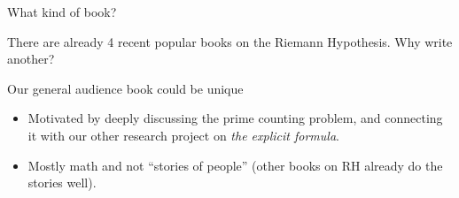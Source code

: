 \documentclass{beamer}
\begin{document}
\begin{frame}{What kind of book?}

There are already 4 recent popular books on the Riemann Hypothesis.  Why write another?
\vfill

\begin{block}{Our general audience book could be unique}
  \begin{itemize}
    \item Motivated by deeply discussing the prime counting problem, and connecting it with our other research project on {\em the explicit formula}.
    \item Mostly math and not ``stories of people'' (other books on RH already do the stories well).
  \end{itemize}
  \end{block}
\end{frame}
\end{document}
